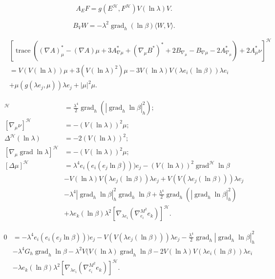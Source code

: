\documentclass[12pt]{article}
\begin{document}
$$A_{E}F = g(E^{\mathcal{H}},F^{\mathcal{H}}) V(\ln \lambda) V.$$

$$ B_{V} W = - \lambda^{2} \operatorname{grad}_{h} (\ln\beta) \langle W,V\rangle .$$

\begin{align*}
&[ \operatorname{trace}  ( (\nabla A)^{*}_{\mu} - (\nabla A)\mu + 3 A^{*}_{\nabla \mu} +
(\nabla_{\mu}B^{*})^{*} + 2 B_{\nabla_{\mu}} - B_{\nabla\mu} -2 A^{*}_{\nabla_{\mu}}) + 2 A^{*}_{\mu}\nu ]^{\mathcal{H}} \\
&= V(V(\ln\lambda))\mu + 3(V(\ln\lambda)^2)  \mu -3V(\ln\lambda) V(\lambda
e_{i}(\ln\beta)) \lambda e_{i}  \\
&+ \mu(g(\lambda e_{j},\mu)) \lambda e_{j} + |\mu|^{2} \mu .
\end{align*}

\begin{align*}
[\nabla_{\mu}\mu]^{\mathcal{H}} &=  \tfrac{\lambda^4 }{2} \operatorname{grad}_{h} ( | \operatorname{grad}_{h} \ln\beta |_{h}^{2}) ;\\
[\nabla_{\mu} \nu]^{\mathcal{H}} &= - (V(\ln\lambda))^2 \mu ; \\
  \Delta^{\mathcal{H}} (\ln\lambda) &= -2(V(\ln\lambda))^2 ;\\
[\nabla_{\mu} \operatorname{grad}\ln\lambda]^{\mathcal{H}} & = - (V(\ln\lambda))^2 \mu ;\\
 [\Delta \mu ]^{\mathcal{H}} &= \lambda^4 e_{i}(e_{i}(e_{j}\ln\beta))) e_{j} - (V(\ln\lambda))^2 \operatorname{grad}^{\mathcal{H}} \ln\beta\\
&- V(\ln\lambda) V(\lambda e_{j}(\ln\beta)) \lambda e_{j} +  V(V(\lambda e_{j}(\ln\beta))) \lambda e_{j}\\
& - \lambda^4 |\operatorname{grad}_{h} \ln\beta|_{h}^{2} \operatorname{grad}_{h} \ln\beta 
+ \tfrac{\lambda^4}{2} \operatorname{grad}_{h}(|\operatorname{grad}_{h} \ln\beta|_{h}^{2}) \\
&+ \lambda e_{k}(\ln\beta)\lambda^2 [\nabla_{\lambda e_i}(\nabla^{M^2}_{e_i}e_k)]^{\mathcal{H}} .
\end{align*}

\begin{align*}
0 &= -\lambda^4 e_{i}(e_{i}(e_{j}\ln\beta))) e_{j} - V(V(\lambda e_{j}(\ln\beta)))
\lambda e_{j} - \tfrac{\lambda^{4}}{2} \operatorname{grad}_{h} |\operatorname{grad}_{h} \ln\beta|_{h}^{2}\\
& - \lambda^4 G_{h} \operatorname{grad}_{h} \ln\beta  
- \lambda^2 V(V(\ln\lambda)\operatorname{grad}_h \ln\beta  - 2V(\ln\lambda)V(\lambda e_{i}(\ln\beta))
\lambda e_{i} \\
&- \lambda e_{k}(\ln\beta)\lambda^2 [\nabla_{\lambda
e_i}(\nabla^{M^2}_{e_i}e_k)]^{\mathcal{H}} .
\end{align*}
\end{document}
